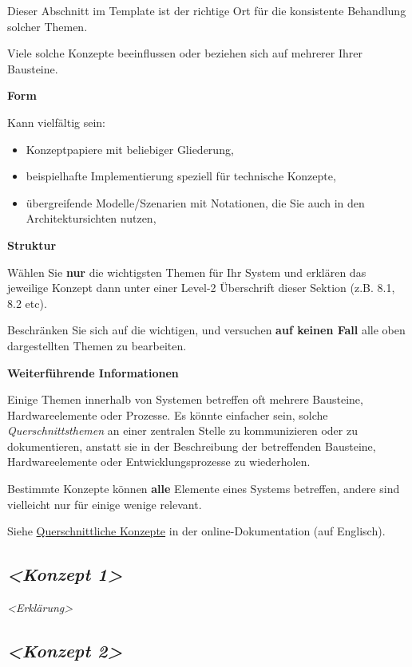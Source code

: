\documentclass[
]{article}
\begin{document}
Dieser Abschnitt im Template ist der richtige Ort für die konsistente
Behandlung solcher Themen.

Viele solche Konzepte beeinflussen oder beziehen sich auf mehrerer Ihrer
Bausteine.

\textbf{Form}

Kann vielfältig sein:

\begin{itemize}
\item
  Konzeptpapiere mit beliebiger Gliederung,
\item
  beispielhafte Implementierung speziell für technische Konzepte,
\item
  übergreifende Modelle/Szenarien mit Notationen, die Sie auch in den
  Architektursichten nutzen,
\end{itemize}

\textbf{Struktur}

Wählen Sie \textbf{nur} die wichtigsten Themen für Ihr System und
erklären das jeweilige Konzept dann unter einer Level-2 Überschrift
dieser Sektion (z.B. 8.1, 8.2 etc).

Beschränken Sie sich auf die wichtigen, und versuchen \textbf{auf keinen
Fall} alle oben dargestellten Themen zu bearbeiten.

\textbf{Weiterführende Informationen}

Einige Themen innerhalb von Systemen betreffen oft mehrere Bausteine,
Hardwareelemente oder Prozesse. Es könnte einfacher sein, solche
\emph{Querschnittsthemen} an einer zentralen Stelle zu kommunizieren
oder zu dokumentieren, anstatt sie in der Beschreibung der betreffenden
Bausteine, Hardwareelemente oder Entwicklungsprozesse zu wiederholen.

Bestimmte Konzepte können \textbf{alle} Elemente eines Systems
betreffen, andere sind vielleicht nur für einige wenige relevant.

Siehe \href{https://docs.arc42.org/section-8/}{Querschnittliche
Konzepte} in der online-Dokumentation (auf Englisch).

\subsection{\texorpdfstring{\emph{\textless Konzept
1\textgreater{}}}{\textless Konzept 1\textgreater{}}}\label{_konzept_1}

\emph{\textless Erklärung\textgreater{}}

\subsection{\texorpdfstring{\emph{\textless Konzept
2\textgreater{}}}{\textless Konzept 2\textgreater{}}}\label{_konzept_2}
\end{document}
